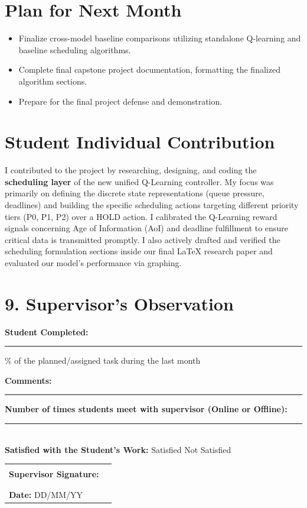 \documentclass[12pt,a4paper]{article}
\begin{document}
\section{Plan for Next Month}
\begin{itemize}[leftmargin=*]
    \item Finalize cross-model baseline comparisons utilizing standalone Q-learning and baseline scheduling algorithms.
    \item Complete final capstone project documentation, formatting the finalized algorithm sections.
    \item Prepare for the final project defense and demonstration.
\end{itemize}

\section{Student Individual Contribution}
I contributed to the project by researching, designing, and coding the \textbf{scheduling layer} of the new unified Q-Learning controller. My focus was primarily on defining the discrete state representations (queue pressure, deadlines) and building the specific scheduling actions targeting different priority tiers (P0, P1, P2) over a HOLD action. I calibrated the Q-Learning reward signals concerning Age of Information (AoI) and deadline fulfillment to ensure critical data is transmitted promptly. I also actively drafted and verified the scheduling formulation sections inside our final LaTeX research paper and evaluated our model's performance via graphing.

\section*{9. Supervisor’s Observation}

\noindent\textbf{Student Completed:} \rule{3cm}{0.4pt}\% 
of the planned/assigned task during the last month

\vspace{0.5cm}

\noindent\textbf{Comments:}

\vspace{2cm}
\noindent\rule{\textwidth}{0.4pt}

\vspace{0.5cm}

\noindent\textbf{Number of times students meet with supervisor (Online or Offline):} \rule{1cm}{0.4pt} \\                                                       
\noindent\textbf{Satisfied with the Student's Work:} 
\hspace{0.5cm}  Satisfied 
\hspace{1cm}  Not Satisfied

\vspace{1.5cm}

\noindent\begin{tabular}{p{7cm} p{6cm}}
\textbf{Supervisor Signature:} & \rule{5cm}{0.4pt} \\
\\
\textbf{Date:} DD/MM/YY
\end{tabular}
\end{document}
